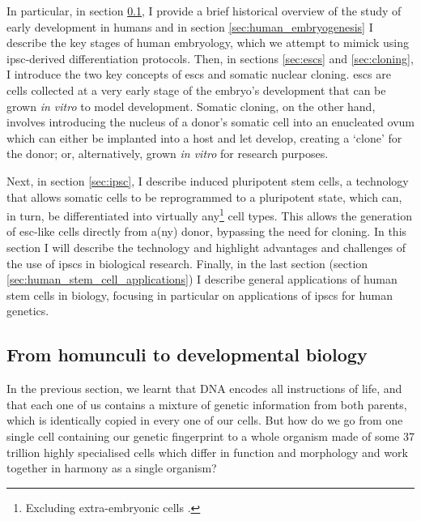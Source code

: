 In particular, in section \ref{sec:history_developmental_biology}, I provide a brief historical overview of the study of early development in humans and in section \ref{sec:human_embryogenesis} I describe the key stages of human embryology, which we attempt to mimick using \gls{ipsc}-derived differentiation protocols.
Then, in sections \ref{sec:escs} and \ref{sec:cloning}, I introduce the two key concepts of \glspl{esc} and somatic nuclear cloning.
\glspl{esc} are cells collected at a very early stage of the embryo's development that can be grown \textit{in vitro} to model development.
Somatic cloning, on the other hand, involves introducing the nucleus of a donor's somatic cell into an enucleated ovum which can either be implanted into a host and let develop, creating a `clone' for the donor; or, alternatively, grown \textit{in vitro} for research purposes.
 
Next, in section \ref{sec:ipsc}, I describe induced pluripotent stem cells, a technology that allows somatic cells to be reprogrammed to a pluripotent state, which can, in turn, be differentiated into virtually any\footnote{Excluding extra-embryonic cells \cite{}.} cell types.
This allows the generation of \gls{esc}-like cells directly from a(ny) donor, bypassing the need for cloning. 
In this section I will describe the technology and highlight advantages and challenges of the use of \glspl{ipsc} in biological research.
Finally, in the last section (section \ref{sec:human_stem_cell_applications}) I describe general applications of human stem cells in biology, focusing in particular on applications of \glspl{ipsc} for human genetics.

\newpage

\subsection{From homunculi to developmental biology}
\label{sec:history_developmental_biology}

In the previous section, we learnt that DNA encodes all instructions of life, and that each one of us contains a mixture of genetic information from both parents, which is identically copied in every one of our cells.
But how do we go from one single cell containing our genetic fingerprint to a whole organism made of some 37 trillion highly specialised cells which differ in function and morphology and work together in harmony as a single organism?\\

